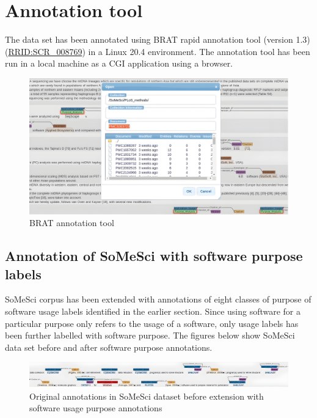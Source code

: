 \section{Annotation tool}
\label{sec:dataset:tool}
The data set has been annotated using BRAT rapid annotation tool (version 1.3) (\href{https://scicrunch.org/resolver/SCR_008769}{RRID:SCR\_008769})  in a Linux 20.4 environment. The annotation tool has been run in a local machine as a \ac{CGI} application using a browser. 

\begin{figure}[htbp]
	\centering
	\includegraphics[width=.75\textwidth]{4.graphics/figures/ch_4/BRAT_tool}
	\caption{BRAT annotation tool}
	\label{fig:chapter04:setup}
\end{figure}

\subsection{Annotation of SoMeSci with software purpose labels}
\label{subsec:dataset:tool:Annotationprocess}

\ac{SoMeSci} corpus has been extended with annotations of eight classes of purpose of software usage labels identified in the earlier section. Since using software for a particular purpose only refers to the usage of a software, only usage labels has been further labelled with software purpose. The figures below show \ac{SoMeSci} data set before and after software purpose annotations. \\

\begin{figure}[htbp]
	\centering
	\includegraphics[width=.99\textwidth]{4.graphics/figures/ch_4/before_ann_hd_PMC3120364_FULLTEX_HD}
	\caption{Original annotations in \ac{SoMeSci} dataset before extension with software usage purpose annotations }
	\label{fig:chapter04:setup}
\end{figure}

